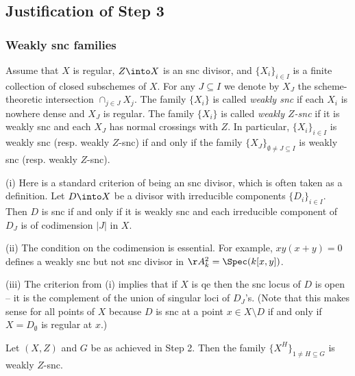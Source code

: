 \documentclass[10pt]{../fichiers-configuration-latex/smfart}
\begin{document}
\subsection{Justification of Step 3}\label{8-step3proof}

\subsubsection{Weakly snc families}\label{8-weaksncsec} Assume that
$X$ is regular, $Z\into X$ is an snc divisor, and $\{X_i\}_{i\in
I}$ is a finite collection of closed subschemes of $X$. For any
$J\subseteq I$ we denote by $X_J$ the scheme-theoretic intersection
$\cap_{j\in J}X_j$. The family $\{X_i\}$ is called {\em weakly
snc} if each $X_i$ is nowhere dense and $X_J$ is regular. The
family $\{X_i\}$ is called {\em weakly $Z$-snc} if it is weakly
snc and each $X_J$ has normal crossings with $Z$. In particular,
$\{X_i\}_{i\in I}$ is weakly snc (resp. weakly $Z$-snc) if and only
if the family $\{X_J\}_{\emptyset\neq J\subseteq I}$ is weakly snc
(resp. weakly $Z$-snc).

\begin{remark2}\label{8-weaksncrem} (i) Here is a standard criterion
of being an snc divisor, which is often taken as a definition. Let
$D\into X$ be a divisor with irreducible components $\{D_i\}_{i\in
I}$. Then $D$ is snc if and only if it is weakly snc and each
irreducible component of $D_J$ is of codimension $|J|$ in $X$.

(ii) The condition on the codimension is essential. For example,
$xy(x+y)=0$ defines a weakly snc but not snc divisor in
$\AA^2_k=\Spec(k[x,y])$.

(iii) The criterion from (i) implies that if $X$ is qe then the snc
locus of $D$ is open -- it is the complement of the union of singular
loci of $D_J$'s. (Note that this makes sense for all points of $X$
because $D$ is snc at a point $x\in X\setminus D$ if and only if
$X=D_\emptyset$ is regular at $x$.)
\end{remark2}

\begin{lemma2}\label{8-Zsnclem} Let $(X,Z)$ and $G$ be as achieved
in Step 2. Then the family $\{X^H\}_{1\neq H\subseteq G}$ is
weakly $Z$-snc.
\end{lemma2}
\end{document}
